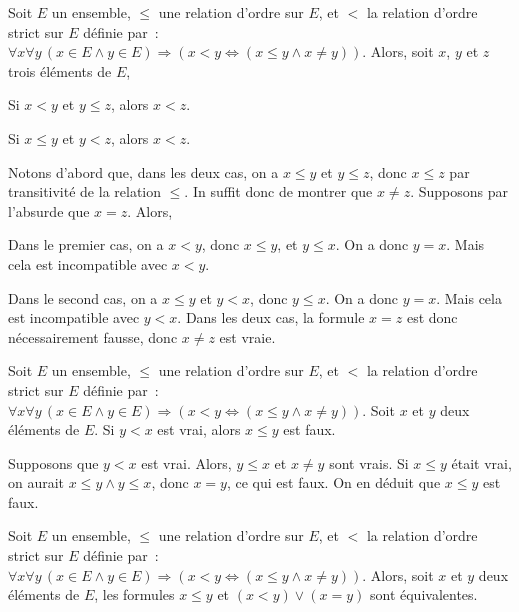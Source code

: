 \hfill\square

\blank[medium]

\noindent{} Soit $E$ un ensemble, $\leq$ une relation d'ordre sur $E$, et $<$ la relation d'ordre strict sur $E$ définie par : $\forall x \forall y \, (x \in E \wedge y \in E) \Rightarrow (x < y \Leftrightarrow (x \leq y \wedge x \neq y))$.
Alors, soit $x$, $y$ et $z$ trois éléments de $E$, 
\startitemize[nowhite]
    \item Si $x < y$ et $y \leq z$, alors $x < z$.
    \item Si $x \leq y$ et $y < z$, alors $x < z$.
\stopitemize

\blank[medium]

\noindent{} Notons d'abord que, dans les deux cas, on a $x \leq y$ et $y \leq z$, donc $x \leq z$ par transitivité de la relation $\leq$. 
    In suffit donc de montrer que $x \neq z$. 
    Supposons par l'absurde que $x = z$. 
    Alors,  
    \startitemize[nowhite]
        \item Dans le premier cas, on a $x < y$, donc $x \leq y$, et $y \leq x$. 
            On a donc $y = x$.
            Mais cela est incompatible avec $x < y$.
        \item Dans le second cas, on a $x \leq y$ et $y < x$, donc $y \leq x$.
            On a donc $y = x$.
            Mais cela est incompatible avec $y < x$.
    \stopitemize
    Dans les deux cas, la formule $x = z$ est donc nécessairement fausse, donc $x \neq z$ est vraie.

   \done 

\blank[medium]

\noindent{} 
    Soit $E$ un ensemble, $\leq$ une relation d'ordre sur $E$, et $<$ la relation d'ordre strict sur $E$ définie par : $\forall x \forall y \, (x \in E \wedge y \in E) \Rightarrow (x < y \Leftrightarrow (x \leq y \wedge x \neq y))$.
    Soit $x$ et $y$ deux éléments de $E$.
    Si $y < x$ est vrai, alors $x \leq y$ est faux.

\blank[medium]

\noindent{} 
    Supposons que $y < x$ est vrai.
    Alors, $y \leq x$ et $x \neq y$ sont vrais.
    Si $x \leq y$ était vrai, on aurait $x \leq y \wedge y \leq x$, donc $x = y$, ce qui est faux.
    On en déduit que $x \leq y$ est faux.

    \done

\blank[medium]

\noindent{} Soit $E$ un ensemble, $\leq$ une relation d'ordre sur $E$, et $<$ la relation d'ordre strict sur $E$ définie par : $\forall x \forall y \, (x \in E \wedge y \in E) \Rightarrow (x < y \Leftrightarrow (x \leq y \wedge x \neq y))$.
Alors, soit $x$ et $y$ deux éléments de $E$, les formules $x \leq y$ et $(x < y) \vee (x = y)$ sont équivalentes.

